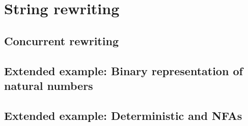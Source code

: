 \chapter{String rewriting}

\section{}

\section{Concurrent rewriting}

\section{Extended example: Binary representation of natural numbers}

\section{Extended example: Deterministic and \aclp*{NFA}}

